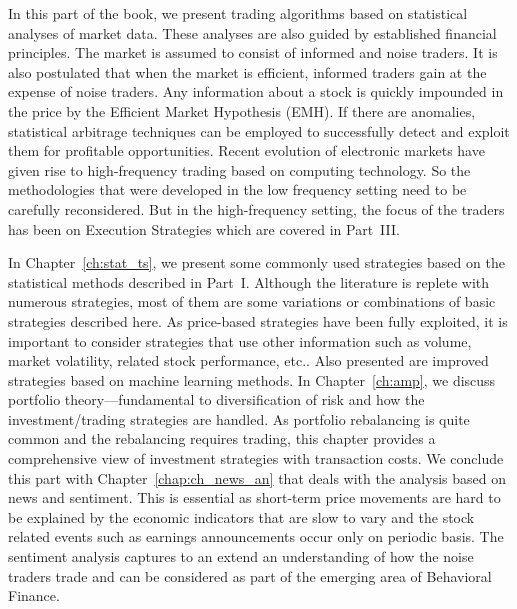 
In this part of the book, we present trading algorithms based on statistical analyses of market data. These analyses are also guided by established financial principles. The market is assumed to consist of informed and noise traders. It is also postulated that when the market is efficient, informed traders gain at the expense of noise traders. Any information about a stock is quickly impounded in the price by the Efficient Market Hypothesis (EMH). If there are anomalies, statistical arbitrage techniques can be employed to successfully detect and exploit them for profitable opportunities. Recent evolution of electronic markets have given rise to high-frequency trading based on computing technology. So the methodologies that were developed in the low frequency setting need to be carefully reconsidered. But in the high-frequency setting, the focus of the traders has been on Execution Strategies which are covered in Part~III.


In Chapter~\ref{ch:stat_ts}, we present some commonly used strategies based on the statistical methods described in Part~I. Although the literature is replete with numerous strategies, most of them are some variations or combinations of basic strategies described here. As price-based strategies have been fully exploited, it is important to consider strategies that use other information such as volume, market volatility, related stock performance, etc.. Also presented are improved strategies based on machine learning methods. In Chapter~\ref{ch:amp}, we discuss portfolio theory---fundamental to diversification of risk and how the investment/trading strategies are handled. As portfolio rebalancing is quite common and the rebalancing requires trading, this chapter provides a comprehensive view of investment strategies with transaction costs. We conclude this part with Chapter~\ref{chap:ch_news_an} that deals with the analysis based on news and sentiment. This is essential as short-term price movements are hard to be explained by the economic indicators that are slow to vary and the stock related events such as earnings announcements occur only on periodic basis. The sentiment analysis captures to an extend an understanding of how the noise traders trade and can be considered as part of the emerging area of Behavioral Finance. 